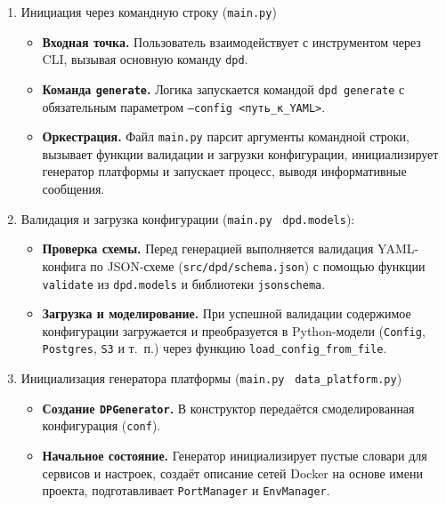 \begin{enumerate}[1.]

      \item Инициация через командную строку (\texttt{main.py})
            \begin{itemize}
                  \item \textbf{Входная точка.} Пользователь взаимодействует с инструментом через CLI, вызывая основную команду \texttt{dpd}.
                  \item \textbf{Команда \texttt{generate}.} Логика запускается командой
                        \texttt{dpd generate} с обязательным параметром
                        \texttt{--config <путь\_к\_YAML>}.
                  \item \textbf{Оркестрация.} Файл \texttt{main.py} парсит аргументы командной строки, вызывает функции валидации и загрузки конфигурации, инициализирует генератор платформы и запускает процесс, выводя информативные сообщения.
            \end{itemize}

      \item Валидация и загрузка конфигурации (\texttt{main.py} \textrightarrow\ \texttt{dpd.models}):
            \begin{itemize}
                  \item \textbf{Проверка схемы.} Перед генерацией выполняется валидация YAML-конфига по JSON-схеме (\texttt{src/dpd/schema.json}) с помощью функции \texttt{validate} из \texttt{dpd.models} и библиотеки \texttt{jsonschema}.
                  \item \textbf{Загрузка и моделирование.} При успешной валидации содержимое конфигурации загружается и преобразуется в Python-модели (\texttt{Config}, \texttt{Postgres}, \texttt{S3} и т.~п.) через функцию \texttt{load\_config\_from\_file}.
            \end{itemize}

      \item Инициализация генератора платформы (\texttt{main.py} \textrightarrow\ \texttt{data\_platform.py})
            \begin{itemize}
                  \item \textbf{Создание \texttt{DPGenerator}.} В конструктор передаётся смоделированная конфигурация (\texttt{conf}).
                  \item \textbf{Начальное состояние.} Генератор инициализирует пустые словари для сервисов и настроек, создаёт описание сетей Docker на основе имени проекта, подготавливает \texttt{PortManager} и \texttt{EnvManager}.
            \end{itemize}


\end{enumerate}

